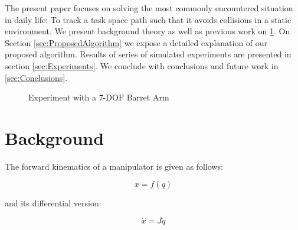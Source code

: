 \documentclass[conference]{IEEEtran}
\newcommand{\J}{\ensuremath{J}}
\newcommand{\dq}{\ensuremath{\dot{q}}}
\newcommand{\q}{\ensuremath{q}}
\begin{document}
The present paper focuses on solving the most commonly encountered
situation in daily life: To track a task space path
such that it avoids collisions in a static
environment. We present background theory as well as previous work on \ref{sec:Background}. 
On Section \ref{sec:ProposedAlgorithm} we expose a detailed explanation of our proposed
algorithm. Results of series of simulated experiments are presented in section \ref{sec:Experiments}. 
We conclude with conclusions and future work in \ref{sec:Conclusions}.
\begin{figure}[]
  \centering
  \caption{ Experiment with a 7-DOF Barret Arm}
  \label{fig:CoverFigure}
\end{figure}


\section{Background}
\label{sec:Background}
The forward kinematics of a manipulator is given as follows:

\begin{equation}
x = f(\q)
\label{eq:FK}
\end{equation}

and its differential version:

\begin{equation}
\dot{x} = \J \dq
\label{eq:Diff_FK}
\end{equation}
\end{document}
